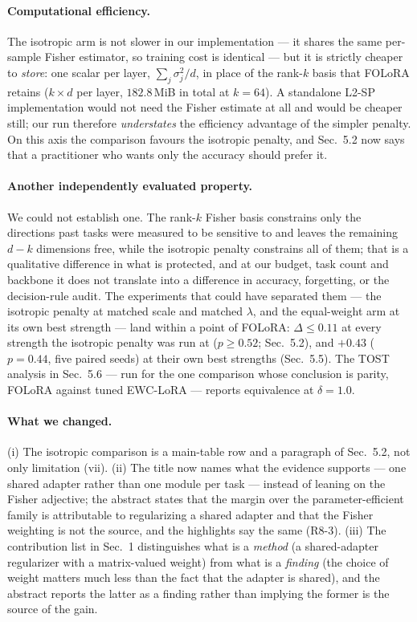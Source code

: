 \paragraph{Computational efficiency.} The isotropic arm is not slower in our implementation
--- it shares the same per-sample Fisher estimator, so training cost is identical --- but it is
strictly cheaper to \emph{store}: one scalar per layer, $\sum_j\sigma_j^2/d$, in place of the
rank-$k$ basis that FOLoRA retains ($k\times d$ per layer, $182.8$\,MiB in total at $k{=}64$).
A standalone L2-SP implementation would not need the Fisher estimate at all and
would be cheaper still; our run therefore \emph{understates} the efficiency advantage of the
simpler penalty. On this axis the comparison favours the isotropic penalty, and
Sec.~5.2 now says that a practitioner who wants only the accuracy should
prefer it.

\paragraph{Another independently evaluated property.} We could not establish one. The rank-$k$
Fisher basis constrains only the directions past tasks were measured to be sensitive to and
leaves the remaining $d-k$ dimensions free, while the isotropic penalty constrains all of
them; that is a qualitative difference in what is protected, and at our budget, task count
and backbone it does not translate into a difference in accuracy, forgetting, or the
decision-rule audit. The experiments that could have separated them --- the isotropic
penalty at matched scale and matched $\lambda$, and the equal-weight arm at its own best
strength --- land within a point of FOLoRA: $\Delta\le0.11$ at every strength the isotropic
penalty was run at ($p\ge0.52$; Sec.~5.2), and $+0.43$ ($p=0.44$, five paired seeds) at
their own best strengths (Sec.~5.5). The TOST analysis in Sec.~5.6 --- run for the one
comparison whose conclusion is parity, FOLoRA against tuned EWC-LoRA --- reports
equivalence at $\delta{=}1.0$.

\paragraph{What we changed.} (i) The isotropic comparison is a main-table row and a paragraph
of Sec.~5.2, not only limitation (vii). (ii) The title now names what the
evidence supports --- one shared adapter rather than one module per task --- instead of
leaning on the Fisher adjective; the abstract states that the margin over the
parameter-efficient family is attributable to regularizing a shared adapter and that the
Fisher weighting is not the source, and the highlights say the same (R8-3). (iii) The
contribution list in Sec.~1 distinguishes what is a \emph{method} (a shared-adapter
regularizer with a matrix-valued weight) from what is a \emph{finding} (the choice of weight
matters much less than the fact that the adapter is shared), and the abstract reports the
latter as a finding rather than implying the former is the source of the gain.

